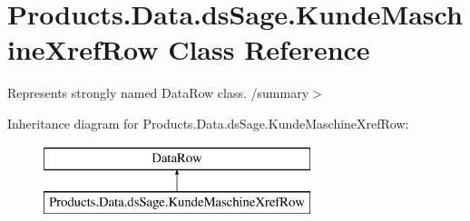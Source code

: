 \hypertarget{class_products_1_1_data_1_1ds_sage_1_1_kunde_maschine_xref_row}{}\section{Products.\+Data.\+ds\+Sage.\+Kunde\+Maschine\+Xref\+Row Class Reference}
\label{class_products_1_1_data_1_1ds_sage_1_1_kunde_maschine_xref_row}


Represents strongly named Data\+Row class. /summary$>$  


Inheritance diagram for Products.\+Data.\+ds\+Sage.\+Kunde\+Maschine\+Xref\+Row\+:\begin{figure}[H]
\begin{center}
\leavevmode
\includegraphics[height=2.000000cm]{class_products_1_1_data_1_1ds_sage_1_1_kunde_maschine_xref_row}
\end{center}
\end{figure}
